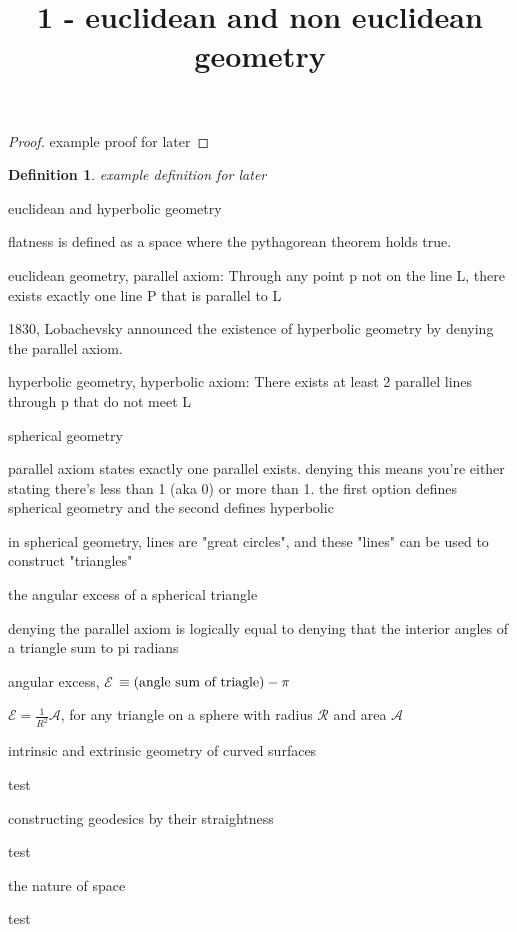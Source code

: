 \documentclass[12pt, letterpaper, twoside]{article}
\title{1 - euclidean and non euclidean geometry}
\newtheorem{mydef}{Definition}
\newenvironment{andrew_section}[1]
    {
    \section{#1}
    \begin{itemize}
    }
    {
    \end{itemize}
    }
\begin{document}
\maketitle

\begin{proof}
    example proof for later
\end{proof}

\begin{mydef}
    example definition for later
\end{mydef}

\begin{andrew_section}{euclidean and hyperbolic geometry}
    \item flatness is defined as a space where the pythagorean theorem holds true.
    \item 
        euclidean geometry, parallel axiom: Through any point p not 
        on the line L, there exists exactly one line P that is parallel
        to L
    \item 
        1830, Lobachevsky announced the existence of hyperbolic geometry 
        by denying the parallel axiom.
    \item 
        hyperbolic geometry, hyperbolic axiom: There exists at least 2
        parallel lines through p that do not meet L
\end{andrew_section}

\begin{andrew_section}{spherical geometry}
    \item 
        parallel axiom states exactly one parallel exists.  denying 
        this means you're either stating there's less than 1 (aka 0) or
        more than 1.  the first option defines spherical geometry and the
        second defines hyperbolic
    \item 
        in spherical geometry, lines are "great circles", and these
        "lines" can be used to construct "triangles"
\end{andrew_section}

\begin{andrew_section}{the angular excess of a spherical triangle}
    \item 
        denying the parallel axiom is logically equal to denying
        that the interior angles of a triangle sum to pi radians
    \item  angular excess, $\mathcal{E}$ $\equiv (\textnormal{angle sum of triagle}) - \pi$ 
    \item 
        $\mathcal{E} = \frac{1}{R^2} \mathcal{A}$, for any triangle
        on a sphere with radius $\mathcal{R}$ and area $\mathcal{A}$
    
\end{andrew_section}

\begin{andrew_section}{intrinsic and extrinsic geometry of curved surfaces}
    \item test
\end{andrew_section}

\begin{andrew_section}{constructing geodesics by their straightness}
    \item test
\end{andrew_section}

\begin{andrew_section}{the nature of space}
    \item test
\end{andrew_section}
\end{document}
